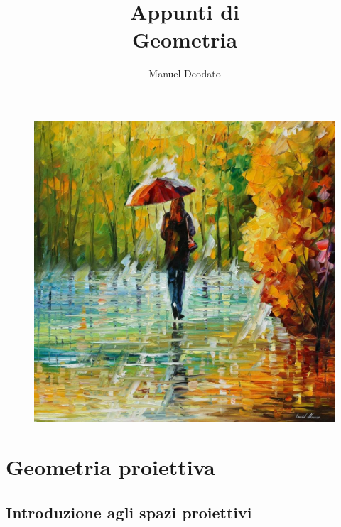 \documentclass[11pt, a4paper]{scrartcl}
\title{Appunti di\\ \vspace{.1cm} Geometria}
\author{Manuel Deodato}
\date{}
\theoremstyle{style1}
\renewcommand{\maketitle}{
\begin{center}
{\sffamily
{\fontsize{20}{20}\selectfont\MakeUppercase\thetitle}}

\vspace{0.2in}

{\large\scshape\sffamily\theauthor}
\end{center}
}
\numberwithin{equation}{subsection}
\begin{document}
\maketitle
\vspace{9cm}
\begin{figure}[h!]
	\centering
	\includegraphics[width=.7\columnwidth]{front1.jpeg}
\end{figure}

\newpage
\tableofcontents 
\newpage
\section{Geometria proiettiva}

\subsection{Introduzione agli spazi proiettivi}
\end{document}
